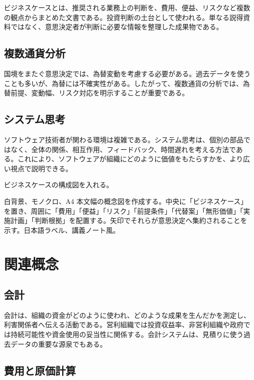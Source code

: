 \documentclass[a4paper,11pt]{article}
\begin{document}
ビジネスケースとは、推奨される業務上の判断を、費用、便益、リスクなど複数の観点からまとめた文書である。投資判断の土台として使われる。単なる説得資料ではなく、意思決定者が判断に必要な情報を整理した成果物である。

\subsection{複数通貨分析}

国境をまたぐ意思決定では、為替変動を考慮する必要がある。過去データを使うことも多いが、為替には不確実性がある。したがって、複数通貨の分析では、為替前提、変動幅、リスク対応を明示することが重要である。

\subsection{システム思考}

ソフトウェア技術者が関わる環境は複雑である。システム思考は、個別の部品ではなく、全体の関係、相互作用、フィードバック、時間遅れを考える方法である。これにより、ソフトウェアが組織にどのように価値をもたらすかを、より広い視点で説明できる。

\begin{todobox}
ビジネスケースの構成図を入れる。
\end{todobox}
\begin{promptbox}
白背景、モノクロ、A4 本文幅の概念図を作成する。中央に「ビジネスケース」を置き、周囲に「費用」「便益」「リスク」「前提条件」「代替案」「無形価値」「実施計画」「判断根拠」を配置する。矢印でそれらが意思決定へ集約されることを示す。日本語ラベル、講義ノート風。
\end{promptbox}

\section{関連概念}

\subsection{会計}

会計は、組織の資金がどのように使われ、どのような成果を生んだかを測定し、利害関係者へ伝える活動である。営利組織では投資収益率、非営利組織や政府では持続可能性や資金使用の妥当性に関係する。会計システムは、見積りに使う過去データの重要な源泉でもある。

\subsection{費用と原価計算}
\end{document}
